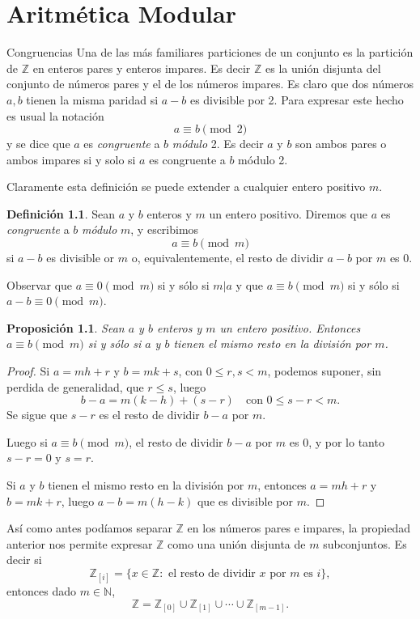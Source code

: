 \documentclass[11pt,spanish,makeidx]{amsbook}
\newtheorem{proposicion}[teorema]{Proposici\'on}
\theoremstyle{definition}
\newtheorem{definicion}{Definici\'on}[section]
\theoremstyle{remark}
\begin{document}
\chapter[Aritmética Modular]{Aritmética Modular}

\begin{section}{Congruencias}
Una de las más familiares particiones de un conjunto es la partición de $\mathbb Z$ en enteros pares y enteros impares. Es decir $\mathbb Z$ es la unión disjunta del conjunto de números pares y el de los números impares. Es claro que dos números $a,b$ tienen la misma paridad si $a-b$ es divisible por 2. Para expresar este hecho es usual la notación
$$
a\equiv b \pmod2
$$
y se dice que $a$ es {\it congruente } a $b$ {\it módulo} 2. Es decir $a$ y $b$ son ambos pares o ambos impares si y solo si $a$ es congruente a $b$ módulo 2.

Claramente esta definición se puede extender a cualquier entero positivo $m$.

\begin{definicion} Sean $a$ y $b$ enteros y $m$ un entero positivo. Diremos que $a$ es {\em congruente} a $b$  {\em módulo} $m$, y escribimos  
$$
a \equiv b \pmod{m}
$$
si $a-b$ es divisible or $m$ o, equivalentemente, el resto de dividir $a-b$ por $m$ es 0.
\end{definicion}

Observar que $a\equiv 0 \pmod{m}$ si  y sólo si $m|a$ y que $a\equiv b \pmod{m}$ si y sólo si $a-b\equiv 0 \pmod{m}$. 

\begin{proposicion}
Sean $a$ y $b$ enteros y $m$ un entero positivo. Entonces $a\equiv b \pmod{m}$ si  y sólo si $a$ y $b$ tienen el mismo resto en la división por $m$.
\end{proposicion}
\begin{proof}
Si $a=mh+r$ y $b=mk+s$, con $0 \le r,s <m$, podemos suponer, sin perdida de generalidad, que $r \le s$, luego
$$
b-a= m(k-h) + (s-r) \quad \text{con $0\le s - r < m$}.
$$
Se sigue que $s-r$ es el resto de dividir $b-a$ por $m$.

Luego si $a\equiv b \pmod{m}$, el resto de dividir   $b-a$ por $m$ es 0, y por lo tanto $s-r=0$ y $s=r$.

Si $a$ y $b$ tienen el mismo resto en la división por $m$, entonces  $a=mh+r$ y $b=mk+r$, luego $a-b = m(h-k)$ que es divisible por $m$.
\end{proof}

Así como antes podíamos separar $\mathbb Z$ en los números pares e impares, la propiedad anterior nos permite expresar $\mathbb Z$ como una unión disjunta de $m$ subconjuntos. Es decir si 
\begin{equation*}
	\mathbb  Z_{[i]} =\{x \in \mathbb Z:\text{ el resto de dividir $x$ por $m$ es $i$}\},
\end{equation*}
entonces dado $m \in \mathbb N$, 
\begin{equation*}
	\mathbb Z= \mathbb Z_{[0]}\cup \mathbb Z_{[1]}\cup \cdots\cup \mathbb Z_{[m-1]}.
\end{equation*}


\end{section}
\end{document}

